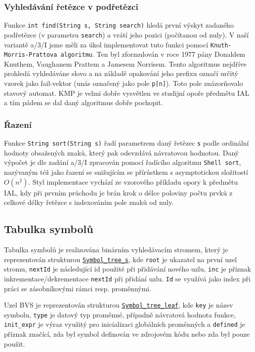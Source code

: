 \documentclass[a4paper,11pt]{article}
\begin{document}
\subsubsection {Vyhledávání řetězce v podřetězci}
Funkce \texttt{int find(String s, String search)} hledá první výskyt zadaného podřetězce (v parametru \texttt{search}) a vrátí jeho pozici (počítanou od nuly). V naší variantě a/3/I jsme měli za úkol implementovat tuto funkci pomocí \texttt{Knuth-Morris-Prattova algoritmu}. Ten byl zformulován v roce 1977 pány Donaldem Knuthem, Vaughanem Prattem a Jamesem Norrisem. Tento algoritmus nejdříve prohledá vyhledáváne slovo a na základě opakování jeho prefixu označí určitý vzorek jako fail-vektor (unás označený jako pole \texttt{p[n]}). Toto pole znázorňovalo stavový automat. KMP je velmi dobře vysvětlen ve studijní opoře předmětu IAL a tím pádem se dal daný algoritmus dobře pochopit.

\subsubsection {Řazení}
Funkce \texttt{String sort(String s)} řadí parametrem daný řetězec \texttt{s} podle ordinální hodnoty obsažených znaků, který pak odevzdává návratovou hodnotou. Daný výpočet je dle zadání a/3/I zpracován pomocí řadícího algoritmu \texttt{Shell sort}, nazývaným též jako řazení se snižujícím se přírůstkem s asymptotickou složitostí~$O(n^{2})$. Styl implementace vychází ze vzorového příkladu opory k předmětu IAL, kdy při prvním průchodu je brán krok o délce poloviny počtu prvků z celkové délky řetězce s indexováním pole znaků od nuly.

\subsection{Tabulka symbolů}
Tabulka symbolů je realizována binárním vyhledávacím stromem, který je reprezentován strukturou \hyperref[lst:stBvsStruct]{\texttt{Symbol\_tree\_s}}, kde \texttt{root} je ukazatel na první uzel stromu, \texttt{nextId} je následující id použité při přidávání nového uzlu, \texttt{inc} je příznak inkrementace/dekrementace \texttt{nextId} při přidání uzlu. \texttt{Id} se využívá jako index při práci se zásobníkovými rámci resp. proměnnými.

Uzel BVS je reprezentován strukturou \hyperref[lst:stBvsLeafStruct]{\texttt{Symbol\_tree\_leaf}}, kde \texttt{key} je název symbolu, \texttt{type} je datový typ proměnné, případně návratová hodnota funkce, \texttt{init\_expr} je výraz využitý pro inicializaci globálních proměnných a \texttt{defined} je příznak značící, zda byl symbol definován ve zdrojovém kódu nebo zda byl pouze použit.
\end{document}
